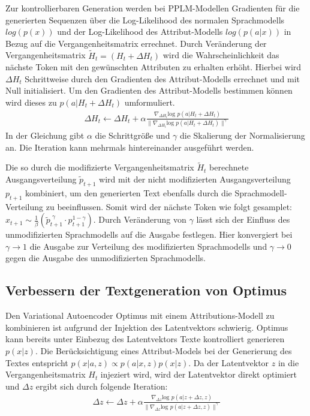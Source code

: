 Zur kontrollierbaren Generation werden bei PPLM-Modellen Gradienten für die generierten Sequenzen über die Log-Likelihood des normalen Sprachmodells $log(p(x))$ und der Log-Likelihood des Attribut-Modells $log(p(a|x))$ in Bezug auf die Vergangenheitsmatrix errechnet. 
Durch Veränderung der Vergangenheitsmatrix $\tilde{H}_t = (H_t+\Delta H_t)$ wird die Wahrscheinlichkeit das nächste Token mit den gewünschten Attributen zu erhalten erhöht. Hierbei wird $\Delta H_t$ Schrittweise durch den Gradienten des Attribut-Modells errechnet und mit Null initialisiert.
Um den Gradienten des Attribut-Modells bestimmen können wird dieses zu $p(a|H_t+\Delta H_t)$ umformuliert.
\begin{align*}
\Delta H_t \leftarrow \Delta H_t + \alpha \frac{\nabla_{\Delta H_t} \text{log }p(a|H_t+\Delta H_t)}{\| \nabla_{\Delta H_t} \text{log }p(a|H_t+\Delta H_t)\|^\gamma}
\end{align*}
In der Gleichung gibt $\alpha$ die Schrittgröße und $\gamma$ die Skalierung der Normalisierung an. 
Die Iteration kann mehrmals hintereinander ausgeführt werden.

Die so durch die modifizierte Vergangenheitsmatrix $\tilde{H}_t$ berechnete Ausgangsverteilung $\tilde{p}_{t+1}$ wird mit der nicht modifizierten Ausgangsverteilung $p_{t+1}$ kombiniert, um den generierten Text ebenfalls durch die Sprachmodell-Verteilung zu beeinflussen.
Somit wird der nächste Token wie folgt gesamplet: $\hat{x}_{t+1} \sim \frac{1}{\beta} (\tilde{p}_{t+1}^{\text{ }\gamma} \cdot p_{t+1}^{1-\gamma})$.
Durch Veränderung von $\gamma$ lässt sich der Einfluss des unmodifizierten Sprachmodells auf die Ausgabe festlegen. Hier konvergiert bei $\gamma \rightarrow 1$ die Ausgabe zur Verteilung des modifizierten Sprachmodells und $\gamma \rightarrow 0$ gegen die Ausgabe des unmodifizierten Sprachmodells.
\subsection{Verbessern der Textgeneration von Optimus}
Den Variational Autoencoder Optimus mit einem Attributions-Modell zu kombinieren ist aufgrund der Injektion des Latentvektors schwierig.
Optimus kann bereits unter Einbezug des Latentvektors Texte kontrolliert generieren $p(x|z)$.
Die Berücksichtigung eines Attribut-Models bei der Generierung des Textes entspricht $p(x|a,z) \propto p(a|x,z)p(x|z)$.%
Da der Latentvektor $z$ in die Vergangenheitsmatrix $H_t$ injeziert wird, wird der Latentvektor direkt optimiert und $\Delta z$ ergibt sich durch folgende Iteration:
\begin{align*}
    \Delta z \leftarrow \Delta z + \alpha \frac{\nabla_{\Delta z} \text{log }p(a|z+\Delta z,z)}{\| \nabla_{\Delta z} \text{log }p(a|z+\Delta z,z)\|^\gamma}
\end{align*}

